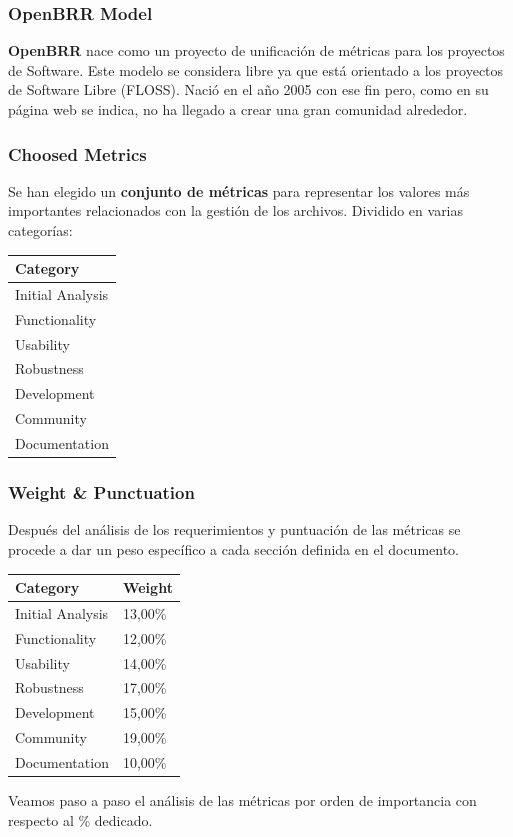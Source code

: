 \documentclass[xcolor=dvipsnames]{beamer}
\begin{document}
\begin{frame}[allowframebreaks]
\frametitle{OpenBRR Model}

\textbf{OpenBRR} nace como un proyecto de unificaci\'on de m\'etricas para los proyectos de Software. Este modelo se considera libre ya que est\'a orientado a los proyectos de Software Libre (FLOSS). Naci\'o en el a\~no 2005 con ese fin pero, como en su p\'agina web se indica, no ha llegado a crear una gran comunidad alrededor.

\end{frame}

\begin{frame}[allowframebreaks]
\frametitle{Choosed Metrics}

Se han elegido un \textbf{conjunto de m\'etricas} para representar los valores m\'as importantes relacionados con la gesti\'on de los archivos. Dividido en varias categor\'ias:

\begin{tabular}{|l|}
    \hline {\bf Category}\\
    \hline Initial Analysis\\
    \hline Functionality\\
    \hline Usability\\
    \hline Robustness\\
    \hline Development\\
    \hline Community\\
    \hline Documentation\\
    \hline
\end{tabular}

\end{frame}

\begin{frame}[allowframebreaks]
\frametitle{Weight \& Punctuation}

\par Despu\'es del an\'alisis de los requerimientos y puntuaci\'on de las m\'etricas se procede a dar un peso espec\'ifico a cada secci\'on definida en el documento.

\begin{tabular}{|l|l|}
    \hline {\bf Category} & {\bf Weight}\\
    \hline Initial Analysis	 & 13,00\%\\
    \hline Functionality & 12,00\%\\
    \hline Usability & 14,00\%\\
    \hline Robustness & 17,00\%\\
    \hline Development & 15,00\%\\
    \hline Community & 19,00\%\\
    \hline Documentation & 10,00\%\\
    \hline
\end{tabular}

Veamos paso a paso el an\'alisis de las m\'etricas por orden de importancia con respecto al \% dedicado.

\end{frame}
\end{document}
